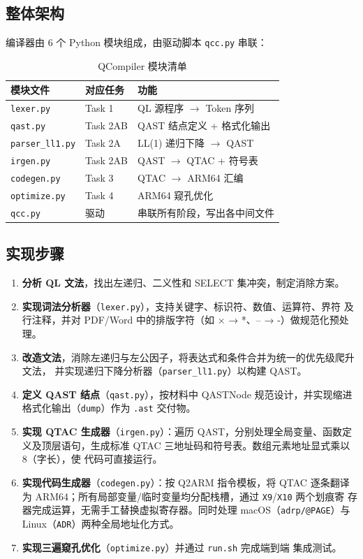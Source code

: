 \documentclass[12pt,a4paper]{ctexart}
\begin{document}
\subsection{整体架构}

编译器由 6 个 Python 模块组成，由驱动脚本 \texttt{qcc.py} 串联：

\begin{table}[H]
\centering
\caption{QCompiler 模块清单}
\label{tab:modules}
\begin{tabular}{lll}
\toprule
模块文件 & 对应任务 & 功能 \\
\midrule
\texttt{lexer.py}      & Task 1   & QL 源程序 \(\to\) Token 序列 \\
\texttt{qast.py}       & Task 2AB & QAST 结点定义 + 格式化输出 \\
\texttt{parser\_ll1.py} & Task 2A  & LL(1) 递归下降 \(\to\) QAST \\
\texttt{irgen.py}      & Task 2AB & QAST \(\to\) QTAC + 符号表 \\
\texttt{codegen.py}    & Task 3   & QTAC \(\to\) ARM64 汇编 \\
\texttt{optimize.py}   & Task 4   & ARM64 窥孔优化 \\
\texttt{qcc.py}        & 驱动     & 串联所有阶段，写出各中间文件 \\
\bottomrule
\end{tabular}
\end{table}

\subsection{实现步骤}

\begin{enumerate}
  \item \textbf{分析 QL 文法}，找出左递归、二义性和 SELECT 集冲突，制定消除方案。
  \item \textbf{实现词法分析器}（\texttt{lexer.py}），支持关键字、标识符、数值、运算符、界符
        及行注释，并对 PDF/Word 中的排版字符（如 × → *、– → -）做规范化预处理。
  \item \textbf{改造文法}，消除左递归与左公因子，将表达式和条件合并为统一的优先级爬升文法，
        并实现递归下降分析器（\texttt{parser\_ll1.py}）以构建 QAST。
  \item \textbf{定义 QAST 结点}（\texttt{qast.py}），按材料中 QASTNode 规范设计，并实现缩进
        格式化输出（\texttt{dump}）作为 \texttt{.ast} 交付物。
  \item \textbf{实现 QTAC 生成器}（\texttt{irgen.py}）：遍历 QAST，分别处理全局变量、函数定
        义及顶层语句，生成标准 QTAC 三地址码和符号表。数组元素地址显式乘以 8（字长），使
        代码可直接运行。
  \item \textbf{实现代码生成器}（\texttt{codegen.py}）：按 Q2ARM 指令模板，将 QTAC 逐条翻译
        为 ARM64；所有局部变量/临时变量均分配栈槽，通过 \texttt{X9}/\texttt{X10} 两个划痕寄
        存器完成运算，无需手工替换虚拟寄存器。同时处理 macOS（\texttt{adrp/@PAGE}）与
        Linux（\texttt{ADR}）两种全局地址化方式。
  \item \textbf{实现三遍窥孔优化}（\texttt{optimize.py}）并通过 \texttt{run.sh} 完成端到端
        集成测试。
\end{enumerate}
\end{document}
